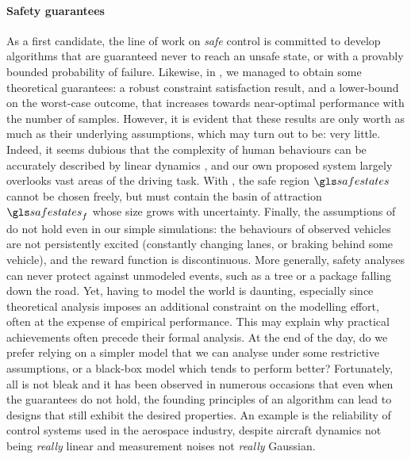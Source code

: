 \paragraph{Safety guarantees}

As a first candidate, the line of work on \emph{safe} control is committed to develop algorithms that are guaranteed never to reach an unsafe state, or with a provably bounded probability of failure. 
Likewise, in , we managed to obtain some theoretical guarantees: a robust constraint satisfaction result, and a lower-bound on the worst-case outcome, that increases towards near-optimal performance with the number of samples. However, it is evident that these results are only worth as much as their underlying assumptions, which may turn out to be: very little. Indeed, it seems dubious that the complexity of human behaviours can be accurately described by linear dynamics , and our own proposed system largely overlooks vast areas of the driving task. With , the safe region $\safestates$ cannot be chosen freely, but must contain the basin of attraction $\safestates_{f}$ whose size grows with uncertainty. Finally, the assumptions of  do not hold even in our simple simulations: the behaviours of observed vehicles are not persistently excited (\ie constantly changing lanes, or braking behind some vehicle), and the reward function is discontinuous. More generally, safety analyses can never protect against unmodeled events, such as a tree or a package falling down the road. Yet, having to model the world is daunting, especially since theoretical analysis imposes an additional constraint on the modelling effort, often at the expense of empirical performance. This may explain why practical achievements often precede their formal analysis. At the end of the day, do we prefer relying on a simpler model that we can analyse under some restrictive assumptions, or a black-box model which tends to perform better? Fortunately, all is not bleak and it has been observed in numerous occasions that even when the guarantees do not hold, the founding principles of an algorithm can lead to designs that still exhibit the desired properties. An example is the reliability of control systems used in the aerospace industry, despite aircraft dynamics not being \emph{really} linear and measurement noises not \emph{really} Gaussian.


